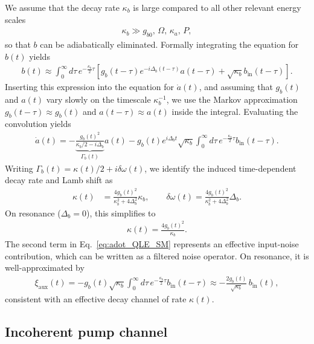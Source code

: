 \documentclass[prl,onecolumn,floatfix,10pt,superscriptaddress]{revtex4-2}
\begin{document}
We assume that the decay rate $\kappa_b$ is large compared to all other relevant energy scales
\begin{align}
\kappa_b \gg g_{b0},\, \Omega,\, \kappa_a,\, P,
\end{align}
so that $b$ can be adiabatically eliminated. Formally integrating the equation for $b(t)$ yields
\begin{align}
b(t) \approx \int_0^\infty d\tau\, e^{-\frac{\kappa_b}{2} \tau}
\left[ g_b(t - \tau) e^{-i \Delta_b (t - \tau)} a(t - \tau)
+ \sqrt{\kappa_b} b_{\text{in}}(t - \tau) \right].
\end{align}
Inserting this expression into the equation for $\dot{a}(t)$, and assuming that $g_b(t)$ and $a(t)$ vary slowly on the timescale $\kappa_b^{-1}$, we use the Markov approximation
$g_b(t - \tau) \approx g_b(t)$ and $a(t - \tau) \approx a(t)$ inside the integral. Evaluating the convolution yields
\begin{align}
\dot{a}(t)
= -\underbrace{\frac{g_b(t)^2}{\kappa_b/2 - i \Delta_b}}_{\Gamma_b(t)} a(t)
- g_b(t) e^{i \Delta_b t} \sqrt{\kappa_b} \int_0^\infty d\tau\, e^{-\frac{\kappa_b}{2} \tau} b_{\text{in}}(t - \tau).
\label{eq:adot_QLE_SM}
\end{align}
Writing $\Gamma_b(t) = \kappa(t)/2 + i\delta\omega(t)$, we identify the induced time-dependent decay rate and Lamb shift as
\begin{align}
\kappa(t) &= \frac{4 g_b(t)^2}{\kappa_b^2 + 4 \Delta_b^2}\kappa_b,\qquad
\delta\omega(t) = \frac{4 g_b(t)^2}{\kappa_b^2 + 4 \Delta_b^2}\Delta_b.
\end{align}
On resonance ($\Delta_b = 0$), this simplifies to
\begin{align}
\kappa(t) = \frac{4 g_b(t)^2}{\kappa_b}.
\end{align}
The second term in Eq.~\eqref{eq:adot_QLE_SM} represents an effective input-noise contribution, which can be written as a filtered noise operator. On resonance, it is well-approximated by
\begin{align}
\xi_{\text{aux}}(t)
= - g_b(t) \sqrt{\kappa_b} \int_0^\infty d\tau\, e^{-\frac{\kappa_b}{2} \tau} b_{\text{in}}(t - \tau)
\approx - \frac{2 g_b(t)}{\sqrt{\kappa_b}}\, b_{\text{in}}(t),
\end{align}
consistent with an effective decay channel of rate $\kappa(t)$.

\subsection{Incoherent pump channel}
\end{document}

